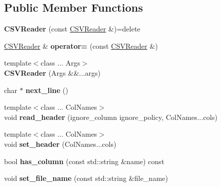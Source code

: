 \subsection*{Public Member Functions}
\begin{DoxyCompactItemize}
\item 
\mbox{\label{classio_1_1CSVReader_a0507ac5abe201969a15df76795e13c28}} 
{\bfseries C\+S\+V\+Reader} (const \hyperlink{classio_1_1CSVReader}{C\+S\+V\+Reader} \&)=delete
\item 
\mbox{\label{classio_1_1CSVReader_a37046e6629cf4254037c14440f14141d}} 
\hyperlink{classio_1_1CSVReader}{C\+S\+V\+Reader} \& {\bfseries operator=} (const \hyperlink{classio_1_1CSVReader}{C\+S\+V\+Reader} \&)
\item 
\mbox{\label{classio_1_1CSVReader_a189debf95672e7cd7582e9f73d7203e5}} 
{\footnotesize template$<$class ... Args$>$ }\\{\bfseries C\+S\+V\+Reader} (Args \&\&...args)
\item 
\mbox{\label{classio_1_1CSVReader_a9fec7797cb27f64360cc48adc5f32c72}} 
char $\ast$ {\bfseries next\+\_\+line} ()
\item 
\mbox{\label{classio_1_1CSVReader_a9fad9ae02aa243dba6bc78156c5ce7e5}} 
{\footnotesize template$<$class ... Col\+Names$>$ }\\void {\bfseries read\+\_\+header} (ignore\+\_\+column ignore\+\_\+policy, Col\+Names...\+cols)
\item 
\mbox{\label{classio_1_1CSVReader_ab68eedff1bd59a49fa4ddb160dff94e0}} 
{\footnotesize template$<$class ... Col\+Names$>$ }\\void {\bfseries set\+\_\+header} (Col\+Names...\+cols)
\item 
\mbox{\label{classio_1_1CSVReader_aaba91fff6faea12e451943e8d32a5a17}} 
bool {\bfseries has\+\_\+column} (const std\+::string \&name) const
\item 
\mbox{\label{classio_1_1CSVReader_a4096c1e43a4fba2b4f5ae21d047b5fbc}} 
void {\bfseries set\+\_\+file\+\_\+name} (const std\+::string \&file\+\_\+name)

\end{DoxyCompactItemize}
